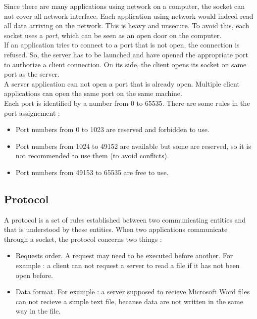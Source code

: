 Since there are many applications using network on a computer, the socket can
not cover all network interface. Each application using network would indeed
read all data arriving on the network. This is heavy and unsecure. To avoid
this, each socket uses a \textit{port}, which can be seen as an open door on 
the computer.\\

If an application tries to connect to a port that is not open, the connection is
refused. So, the server has to be launched and have opened the appropriate port
to authorize a client connection. On its side, the client opens its socket
on same port as the server. \\

A server application can not open a port that is already open. Multiple client
applications can open the same port on the same machine.\\

Each port is identified by a number from 0 to 65535. There are some rules
in the port assignement : 

\begin{itemize}
 \item Port numbers from 0 to 1023 are reserved and forbidden to use. 
 \item Port numbers from 1024 to 49152 are available but some are reserved, so
it is not recommended to use them (to avoid conflicts).
 \item Port numbers from 49153 to 65535 are free to use.\\
\end{itemize}


\subsection{Protocol}

A protocol is a set of rules established between two communicating entities and
that is understood by these entities. When two applications communicate through
a socket, the protocol concerns two things :

\begin{itemize}
 \item Requests order. A request may need to be executed before another. For
example : a client can not request a server to read a file if it has not been
open before.
 \item Data format. For example : a server supposed to recieve Microsoft
Word files can not recieve a simple text file, because data are not written in
the same way in the file.\\
\end{itemize}

